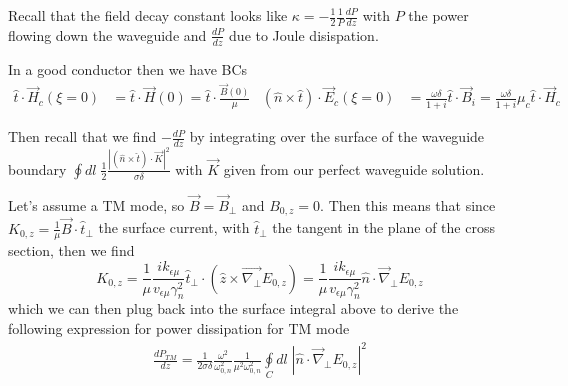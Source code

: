 \documentclass[10pt]{report}
\newcommand{\rd}[2]{\frac{d#1}{d#2}}
\newcommand{\abs}[1]{\left|#1\right|}
\begin{document}
Recall that the field decay constant looks like $\kappa = -\frac{1}{2} \frac{1}{P}\rd{P}{z}$ with $P$ the power flowing down the waveguide and $\rd{P}{z}$ due to Joule disispation.

In a good conductor then we have BCs
\begin{align}
    \hat{t} \cdot \vec{H}_c(\xi = 0) &= \hat{t} \cdot \vec{H}(0) = \hat{t} \cdot \frac{\vec{B}(0)}{\mu} & (\hat{n} \times \hat{t}) \cdot \vec{E}_c(\xi = 0) &= \frac{\omega \delta}{1 + i} \hat{t} \cdot \vec{B}_i = \frac{\omega \delta}{1+i}\mu_c\hat{t} \cdot \vec{H}_c
\end{align}

Then recall that we find $-\rd{P}{z}$ by integrating over the surface of the waveguide boundary $\oint dl\; \frac{1}{2}\frac{\abs{(\hat{n} \times \hat{t}) \cdot \vec{K}}^2}{\sigma \delta}$ with $\vec{K}$ given from our perfect waveguide solution.

Let's assume a TM mode, so $\vec{B} = \vec{B}_{\perp}$ and $B_{0,z} = 0$. Then this means that since $K_{0,z} = \frac{1}{\mu}\vec{B} \cdot \hat{t}_{\perp}$ the surface current, with $\hat{t}_\perp$ the tangent in the plane of the cross section, then we find
\begin{equation}
    K_{0,z} = \frac{1}{\mu}\frac{i k_{\epsilon \mu}}{v_{\epsilon \mu}\gamma_n^2}\hat{t}_\perp \cdot \left( \hat{z} \times \vec{\nabla_{\perp}}E_{0,z} \right) = \frac{1}{\mu}\frac{i k_{\epsilon \mu}}{v_{\epsilon \mu}\gamma_n^2}\hat{n} \cdot \vec{\nabla}_\perp E_{0,z}
\end{equation}
which we can then plug back into the surface integral above to derive the following expression for power dissipation for TM mode
\begin{align}
    \rd{P_{TM}}{z} = \frac{1}{2\sigma\delta} \frac{\omega^2}{\omega_{0,n}^2}\frac{1}{\mu^2 \omega_{0,n}^2}\oint\limits_C dl\; \abs{\hat{n} \cdot \vec{\nabla} _{\perp} E_{0,z}}^2
\end{align}
\end{document}
